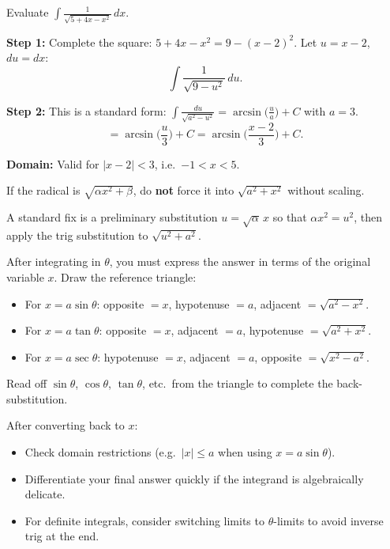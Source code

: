 \begin{examplebox}[title={Worked Example (Tutorial 5, Q2(c)): Completing the square + trig sub}]

Evaluate $\displaystyle \int \frac{1}{\sqrt{5+4x-x^2}}\,dx$.

\textbf{Step 1:} Complete the square: $5+4x-x^2 = 9-(x-2)^2$. Let $u=x-2$, $du=dx$:
\[
\int \frac{1}{\sqrt{9-u^2}}\,du.
\]

\textbf{Step 2:} This is a standard form: $\int\frac{du}{\sqrt{a^2-u^2}}=\arcsin\!\big(\frac{u}{a}\big)+C$ with $a=3$.
\[
= \arcsin\!\Big(\frac{u}{3}\Big)+C = \arcsin\!\Big(\frac{x-2}{3}\Big)+C.
\]

\textbf{Domain:} Valid for $|x-2|<3$, i.e.\ $-1<x<5$.

\end{examplebox}

\begin{commonmistake}[title={Common Mistake: Losing constants in the substitution}]

If the radical is $\sqrt{\alpha x^2+\beta}$, do \textbf{not} force it into $\sqrt{a^2+x^2}$ without scaling.

A standard fix is a preliminary substitution $u=\sqrt{\alpha}\,x$ so that $\alpha x^2=u^2$, then apply the trig substitution to $\sqrt{u^2+a^2}$.

\end{commonmistake}

\begin{commonmistake}[title={Common Mistake: Forgetting to convert back to $x$}]

After integrating in $\theta$, you must express the answer in terms of the original variable $x$. Draw the reference triangle:
\begin{itemize}[leftmargin=*]
\item For $x=a\sin\theta$: opposite $=x$, hypotenuse $=a$, adjacent $=\sqrt{a^2-x^2}$.
\item For $x=a\tan\theta$: opposite $=x$, adjacent $=a$, hypotenuse $=\sqrt{a^2+x^2}$.
\item For $x=a\sec\theta$: hypotenuse $=x$, adjacent $=a$, opposite $=\sqrt{x^2-a^2}$.
\end{itemize}
Read off $\sin\theta$, $\cos\theta$, $\tan\theta$, etc.\ from the triangle to complete the back-substitution.
\end{commonmistake}

\begin{examtip}[title={Exam Focus: Back-substitution sanity checks}]

After converting back to $x$:

\begin{itemize}
\item Check domain restrictions (e.g.\ $|x|\le a$ when using $x=a\sin\theta$).
\item Differentiate your final answer quickly if the integrand is algebraically delicate.
\item For definite integrals, consider switching limits to $\theta$-limits to avoid inverse trig at the end.
\end{itemize}

\end{examtip}

